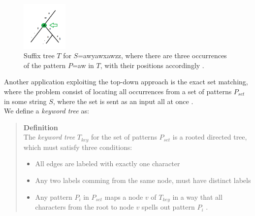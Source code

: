 \documentclass[12pt]{article} %
\begin{document}
\begin{figure}[H]
    \centering
    \includegraphics[width=0.2\textwidth]{ExactMatching}
    \captionsetup{width=0.8
    \textwidth}
    \caption{Suffix tree $T$ for $S$=awyawxawzz, where there are three occurrences of the pattern $P$=aw in $T$, with their positions accordingly \cite{gusfield}.}
    \label{fig:ExactMatching}
\end{figure}

Another application exploiting the top-down approach is the exact set matching, where the problem consist of locating all occurrences from a set of patterns $P_{set}$ in some string $S$, where the set is sent as an input all at once \cite{gusfield}. \\ We define a \emph{keyword tree} as:

\begin{quote}
\textbf{Definition} \\
The \emph{keyword tree} $T_{key}$ for the set of patterns $P_{set}$ is a rooted directed tree, which must satisfy three conditions:
\begin{itemize}  
\item All edges are labeled with exactly one character
\item Any two labels comming from the same node, must have distinct labels
\item Any pattern $P_i$ in $P_{set}$ maps a node $v$ of $T_{key}$ in a way that all characters from the root to node $v$ spells out pattern $P_i$ \cite{gusfield}.
\end{itemize}
\end{quote}
\end{document}
